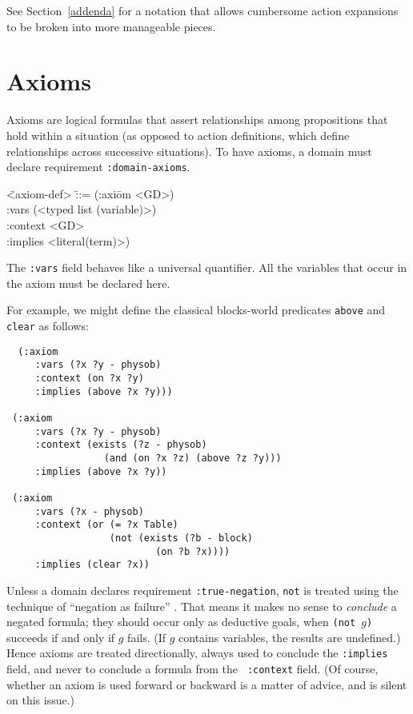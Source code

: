 See Section~\ref{addenda} for a notation that allows cumbersome action
expansions to be broken into more manageable pieces.

    \section{Axioms}
\label{axioms}

Axioms are logical formulas that assert relationships among propositions that hold
within a situation (as opposed to action definitions, which define relationships
across successive situations). To have axioms, a domain must declare requirement
{\tt :domain-axioms}.

\begin{tabtt}
\bump\=  <axiom-def>   \=  ::= (:axi\=om <GD>) \+\+\+\\
                                    :vars (<typed list (variable)>) \\
                                    :context <GD> \\
                                    :implies <literal(term)>)
\end{tabtt}
The {\tt :vars} field behaves like a universal quantifier.  All the 
variables that occur in the axiom must be declared here.

For example, we might define the classical blocks-world predicates
{\tt above} and {\tt clear} as follows:

\begin{verbatim}
  (:axiom 
     :vars (?x ?y - physob)
     :context (on ?x ?y)
     :implies (above ?x ?y)))

 (:axiom 
     :vars (?x ?y - physob)
     :context (exists (?z - physob)
                 (and (on ?x ?z) (above ?z ?y)))
     :implies (above ?x ?y))

 (:axiom
     :vars (?x - physob)
     :context (or (= ?x Table)
                  (not (exists (?b - block)
                          (on ?b ?x))))
     :implies (clear ?x))
\end{verbatim}

Unless a domain declares requirement {\tt :true-negation}, {\tt not}
is treated using the technique of ``negation as failure'' \cite{clark-78}.
That means it makes no sense to {\em conclude} a negated formula; they
should occur only as deductive goals, when {\tt (not $g$)} succeeds if
and only if $g$ fails.  (If $g$ contains variables, the results are
undefined.)  Hence axioms are treated directionally, always used to
conclude the 
{\tt :implies} field, and never to conclude a formula from the {\tt
:context} field.  (Of course, whether an axiom is used forward or
backward is a matter of advice, and \lang{} is silent on this issue.)

